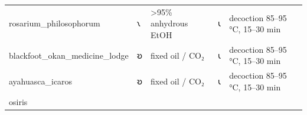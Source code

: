\documentclass[12pt,a4paper]{article}
\begin{document}
\begin{longtable}[]{@{}lllll@{}}
\begin{minipage}[t]{0.17\columnwidth}
rosarium\_philosophorum\strut
\end{minipage} & \begin{minipage}[t]{0.17\columnwidth}\raggedright
𐑯\strut
\end{minipage} & \begin{minipage}[t]{0.17\columnwidth}\raggedright
\textgreater95\% anhydrous EtOH\strut
\end{minipage} & \begin{minipage}[t]{0.17\columnwidth}\raggedright
𐑧\strut
\end{minipage} & \begin{minipage}[t]{0.17\columnwidth}\raggedright
decoction 85--95 °C, 15--30 min\strut
\end{minipage}\tabularnewline
\begin{minipage}[t]{0.17\columnwidth}\raggedright
blackfoot\_okan\_medicine\_lodge\strut
\end{minipage} & \begin{minipage}[t]{0.17\columnwidth}\raggedright
𐑹\strut
\end{minipage} & \begin{minipage}[t]{0.17\columnwidth}\raggedright
fixed oil / CO₂\strut
\end{minipage} & \begin{minipage}[t]{0.17\columnwidth}\raggedright
𐑧\strut
\end{minipage} & \begin{minipage}[t]{0.17\columnwidth}\raggedright
decoction 85--95 °C, 15--30 min\strut
\end{minipage}\tabularnewline
\begin{minipage}[t]{0.17\columnwidth}\raggedright
ayahuasca\_icaros\strut
\end{minipage} & \begin{minipage}[t]{0.17\columnwidth}\raggedright
𐑹\strut
\end{minipage} & \begin{minipage}[t]{0.17\columnwidth}\raggedright
fixed oil / CO₂\strut
\end{minipage} & \begin{minipage}[t]{0.17\columnwidth}\raggedright
𐑧\strut
\end{minipage} & \begin{minipage}[t]{0.17\columnwidth}\raggedright
decoction 85--95 °C, 15--30 min\strut
\end{minipage}\tabularnewline
\begin{minipage}[t]{0.17\columnwidth}\raggedright
osiris\strut
\end{minipage} & \begin{minipage}[t]{0.17\columnwidth}\raggedright

\end{minipage}
\end{longtable}
\end{document}
